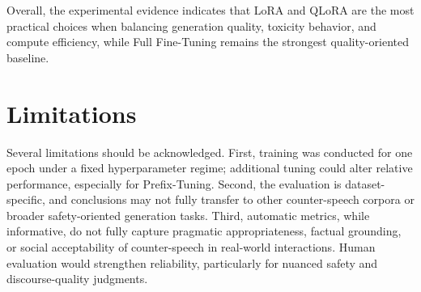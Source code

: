 \documentclass[11pt]{article}
\begin{document}
Overall, the experimental evidence indicates that LoRA and QLoRA are the most practical choices when balancing generation quality, toxicity behavior, and compute efficiency, while Full Fine-Tuning remains the strongest quality-oriented baseline.

\section{Limitations}
Several limitations should be acknowledged. First, training was conducted for one epoch under a fixed hyperparameter regime; additional tuning could alter relative performance, especially for Prefix-Tuning. Second, the evaluation is dataset-specific, and conclusions may not fully transfer to other counter-speech corpora or broader safety-oriented generation tasks. Third, automatic metrics, while informative, do not fully capture pragmatic appropriateness, factual grounding, or social acceptability of counter-speech in real-world interactions. Human evaluation would strengthen reliability, particularly for nuanced safety and discourse-quality judgments.
\end{document}
